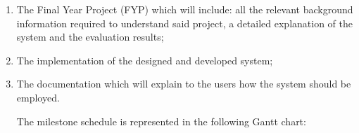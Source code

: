 \documentclass{csfyp}
\begin{document}
\begin{enumerate}[nolistsep]

  \item The Final Year Project (FYP) which will include: all the relevant background information required to understand said project, a detailed explanation of the system and the evaluation results; 

  \item The implementation of the designed and developed system;

  \item The documentation which will explain to the users how the system should be employed. 

The milestone schedule is represented in the following Gantt chart: \\

\noindent{}

\end{enumerate}


%

\nocite{*}

\end{document}
